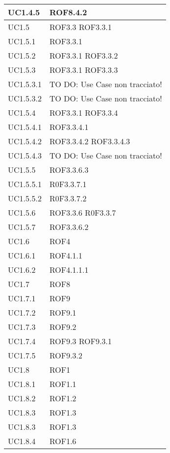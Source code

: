 \begin{center}
\begin{longtable}{| p{4cm} | p{4cm} |}
\hline
UC1.4.5 & ROF8.4.2 \\
\hline
UC1.5 & ROF3.3 \newline ROF3.3.1 \\
\hline
UC1.5.1 & ROF3.3.1 \\
\hline
UC1.5.2 & ROF3.3.1 \newline ROF3.3.2 \\
\hline
UC1.5.3 & ROF3.3.1 \newline ROF3.3.3 \\
\hline
UC1.5.3.1 & TO DO: Use Case non tracciato! \\
\hline
UC1.5.3.2 & TO DO: Use Case non tracciato! \\
\hline
UC1.5.4 & ROF3.3.1 \newline ROF3.3.4 \\
\hline
UC1.5.4.1 & ROF3.3.4.1 \\
\hline
UC1.5.4.2 & ROF3.3.4.2 \newline ROF3.3.4.3 \\
\hline
UC1.5.4.3 & TO DO: Use Case non tracciato! \\
\hline
UC1.5.5 & ROF3.3.6.3 \\
\hline
UC1.5.5.1 & R0F3.3.7.1 \\
\hline
UC1.5.5.2 & R0F3.3.7.2 \\
\hline
UC1.5.6 & ROF3.3.6 \newline R0F3.3.7 \\
\hline
UC1.5.7 & ROF3.3.6.2 \\
\hline
UC1.6 & ROF4 \\
\hline
UC1.6.1 & ROF4.1.1 \\
\hline
UC1.6.2 & ROF4.1.1.1 \\
\hline
UC1.7 & ROF8 \\
\hline
UC1.7.1 & ROF9 \\
\hline
UC1.7.2 & ROF9.1 \\
\hline
UC1.7.3 & ROF9.2 \\
\hline
UC1.7.4 & ROF9.3 \newline ROF9.3.1 \\
\hline
UC1.7.5 & ROF9.3.2 \\
\hline
UC1.8 & ROF1 \\
\hline
UC1.8.1 & ROF1.1 \\
\hline
UC1.8.2 & ROF1.2 \\
\hline
UC1.8.3 & ROF1.3 \\
\hline
UC1.8.3 & ROF1.3 \\
\hline
UC1.8.4 & ROF1.6 \\
\hline

\end{longtable}
\end{center}
